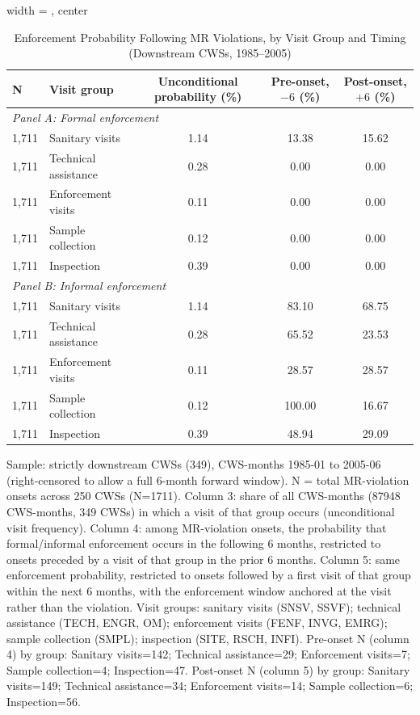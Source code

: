 \begin{table}[htbp]
\caption{\label{tab:visit_to_enf} Enforcement Probability Following MR Violations, by Visit Group and Timing (Downstream CWSs, 1985--2005)}
\bigskip
\centering
\begin{adjustbox}{width = \textwidth, center}
\begin{tabular}{llccc}
\toprule
N & Visit group & Unconditional probability (\%) & Pre-onset, $-6$ (\%) & Post-onset, $+6$ (\%) \\
\midrule
\multicolumn{5}{l}{\textit{Panel A: Formal enforcement}} \\[3pt]
1{,}711 & Sanitary visits & 1.14 & 13.38 & 15.62 \\
1{,}711 & Technical assistance & 0.28 & 0.00 & 0.00 \\
1{,}711 & Enforcement visits & 0.11 & 0.00 & 0.00 \\
1{,}711 & Sample collection & 0.12 & 0.00 & 0.00 \\
1{,}711 & Inspection & 0.39 & 0.00 & 0.00 \\
\midrule
\multicolumn{5}{l}{\textit{Panel B: Informal enforcement}} \\[3pt]
1{,}711 & Sanitary visits & 1.14 & 83.10 & 68.75 \\
1{,}711 & Technical assistance & 0.28 & 65.52 & 23.53 \\
1{,}711 & Enforcement visits & 0.11 & 28.57 & 28.57 \\
1{,}711 & Sample collection & 0.12 & 100.00 & 16.67 \\
1{,}711 & Inspection & 0.39 & 48.94 & 29.09 \\
\bottomrule
\end{tabular}
\end{adjustbox}
{\tiny\linespread{1}\selectfont \par \raggedright 
Sample: strictly downstream CWSs (349), CWS-months 1985-01 to 2005-06 (right-censored to allow a full 6-month forward window). N = total MR-violation onsets across 250 CWSs (N=1711). Column 3: share of all CWS-months (87948 CWS-months, 349 CWSs) in which a visit of that group occurs (unconditional visit frequency). Column 4: among MR-violation onsets, the probability that formal/informal enforcement occurs in the following 6 months, restricted to onsets preceded by a visit of that group in the prior 6 months. Column 5: same enforcement probability, restricted to onsets followed by a first visit of that group within the next 6 months, with the enforcement window anchored at the visit rather than the violation. Visit groups: sanitary visits (SNSV, SSVF); technical assistance (TECH, ENGR, OM); enforcement visits (FENF, INVG, EMRG); sample collection (SMPL); inspection (SITE, RSCH, INFI). Pre-onset N (column 4) by group: Sanitary visits=142; Technical assistance=29; Enforcement visits=7; Sample collection=4; Inspection=47. Post-onset N (column 5) by group: Sanitary visits=149; Technical assistance=34; Enforcement visits=14; Sample collection=6; Inspection=56.
}
\end{table}

